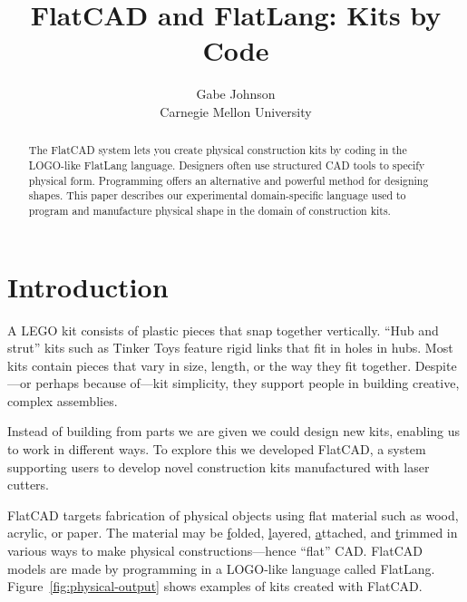 \documentclass[times, 10pt,twocolumn]{article}
\title{FlatCAD and FlatLang: Kits by Code}
\author{
Gabe Johnson\\
Carnegie Mellon University
}
\begin{document}
\maketitle

\begin{abstract}
The \nohyphens{FlatCAD} system lets you create physical construction
kits by coding in the LOGO-like \nohyphens{FlatLang}
language. Designers often use structured CAD tools to specify physical
form. Programming offers an alternative and powerful method for
designing shapes. This paper describes our experimental
domain-specific language used to program and manufacture physical
shape in the domain of construction kits.
\end{abstract}

\section{Introduction}

A LEGO kit consists of plastic pieces that snap together
vertically. ``Hub and strut'' kits such as Tinker Toys feature rigid
links that fit in holes in hubs. Most kits contain pieces that vary in
size, length, or the way they fit together. Despite---or perhaps
because of---kit simplicity, they support people in building creative,
complex assemblies.

Instead of building from parts we are given we could design new kits,
enabling us to work in different ways. To explore this we developed
\nohyphens{FlatCAD}, a system supporting users to develop novel
construction kits manufactured with laser cutters.

\nohyphens{FlatCAD} targets fabrication of physical objects using flat
material such as wood, acrylic, or paper. The material may be
\underline{f}olded, \underline{l}ayered, \underline{a}ttached, and
\underline{t}rimmed in various ways to make physical
constructions---hence ``flat'' CAD. \nohyphens{FlatCAD} models are
made by programming in a LOGO-like language called
\nohyphens{FlatLang}. Figure~\ref{fig:physical-output} shows examples
of kits created with \nohyphens{FlatCAD}.
\end{document}
